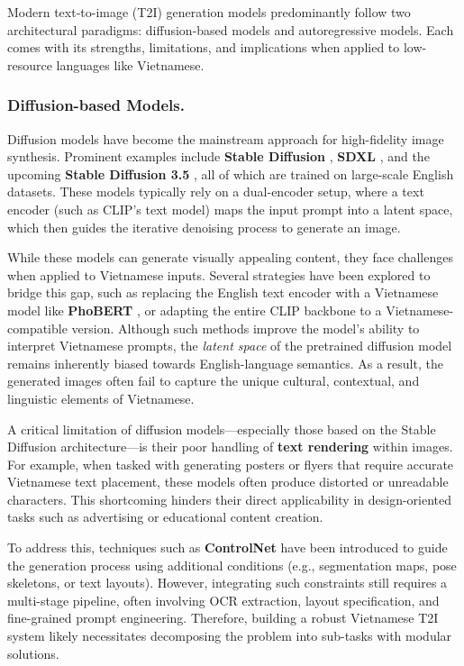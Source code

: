 \documentclass[conference]{IEEEtran}
\begin{document}
Modern text-to-image (T2I) generation models predominantly follow two architectural paradigms: diffusion-based models and autoregressive models. Each comes with its strengths, limitations, and implications when applied to low-resource languages like Vietnamese.

\subsubsection{Diffusion-based Models.} Diffusion models have become the mainstream approach for high-fidelity image synthesis. Prominent examples include \textbf{Stable Diffusion} \cite{stablediffusion}, \textbf{SDXL} \cite{stablediffusionxl2023}, and the upcoming \textbf{Stable Diffusion 3.5} \cite{stablediffusion35}, all of which are trained on large-scale English datasets. These models typically rely on a dual-encoder setup, where a text encoder (such as CLIP's text model) maps the input prompt into a latent space, which then guides the iterative denoising process to generate an image.

While these models can generate visually appealing content, they face challenges when applied to Vietnamese inputs. Several strategies have been explored to bridge this gap, such as replacing the English text encoder with a Vietnamese model like \textbf{PhoBERT} \cite{nguyen2020phobertpretrainedlanguagemodels}, or adapting the entire CLIP \cite{clip} backbone to a Vietnamese-compatible version. Although such methods improve the model's ability to interpret Vietnamese prompts, the \emph{latent space} of the pretrained diffusion model remains inherently biased towards English-language semantics. As a result, the generated images often fail to capture the unique cultural, contextual, and linguistic elements of Vietnamese.

A critical limitation of diffusion models—especially those based on the Stable Diffusion architecture—is their poor handling of \textbf{text rendering} within images. For example, when tasked with generating posters or flyers that require accurate Vietnamese text placement, these models often produce distorted or unreadable characters. This shortcoming hinders their direct applicability in design-oriented tasks such as advertising or educational content creation.

To address this, techniques such as \textbf{ControlNet} \cite{controlnet2023} have been introduced to guide the generation process using additional conditions (e.g., segmentation maps, pose skeletons, or text layouts). However, integrating such constraints still requires a multi-stage pipeline, often involving OCR extraction, layout specification, and fine-grained prompt engineering. Therefore, building a robust Vietnamese T2I system likely necessitates decomposing the problem into sub-tasks with modular solutions.
\end{document}
